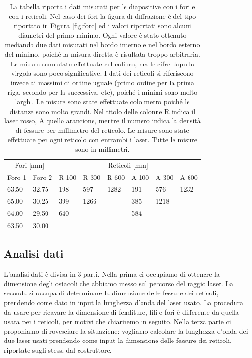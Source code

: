 \begin{table}[b!]
    \centering
    \footnotesize
    \begin{tabular}{l l | l l l | l l l}
        \toprule
        \multicolumn{2}{c|}{Fori [mm]} & \multicolumn{6}{c}{Reticoli [mm]} \\
        Foro 1 &      Foro 2 & R 100 &   R 300 &   R 600 & A 100 & A 300 & A 600\\
        \midrule
        63.50 &           32.75      & 198   &   597   &   1282  & 191   & 576   & 1232 \\
        65.00 &           30.25      & 399   &   1266  &         & 385   & 1218  &      \\
        64.00 &           29.50      & 640   &         &         & 584   &       &      \\
        63.50 &           30.00      &       &         &         &       &       &      \\
        \bottomrule
    \end{tabular}
    \caption{La tabella riporta i dati misurati per le diapositive con i fori e con i reticoli.
        Nel caso dei fori la figura di diffrazione è del tipo riportato in Figura \ref{fig:foro}
        ed i valori riportati sono alcuni diametri del primo minimo. Ogni valore è stato ottenuto mediando
        due dati misurati nel bordo interno e nel bordo esterno del minimo, poiché la misura diretta è risultata
        troppo arbitraria. Le misure sono state effettuate col calibro, ma le cifre dopo la virgola sono poco significative.
        I dati dei reticoli si riferiscono invece ai massimi di ordine uguale
        (primo ordine per la prima riga, secondo per la successiva, etc), poiché i minimi sono molto larghi.
        Le misure sono state effettuate colo metro poiché le distanze sono molto grandi. Nel titolo delle colonne R indica il laser
        rosso, A quello arancione, mentre il numero indica la densità di fessure per millimetro del reticolo. Le misure
        sono state effettuare per ogni reticolo con entrambi i laser. Tutte le misure sono in millimetri.}
    \label{tab:foret}
\end{table}

\subsection{Analisi dati}

L'analisi dati è divisa in 3 parti. Nella prima ci occupiamo di ottenere la dimensione degli ostacoli
che abbiamo messo sul percorso del raggio laser. La seconda si occupa di determinare la dimensione
delle fessure dei reticoli, prendendo come dato in input la lunghezza d'onda del laser usato.
La procedura da usare per ricavare la dimensione di fenditure, fili e fori è differente da quella usata
per i reticoli, per motivi che chiariremo in seguito.
Nella terza parte ci proponiamo di rovesciare la situazione: vogliamo calcolare la lunghezza d'onda dei due
laser usati prendendo come input la dimensione delle fessure dei reticoli, riportate sugli stessi dal costruttore.

